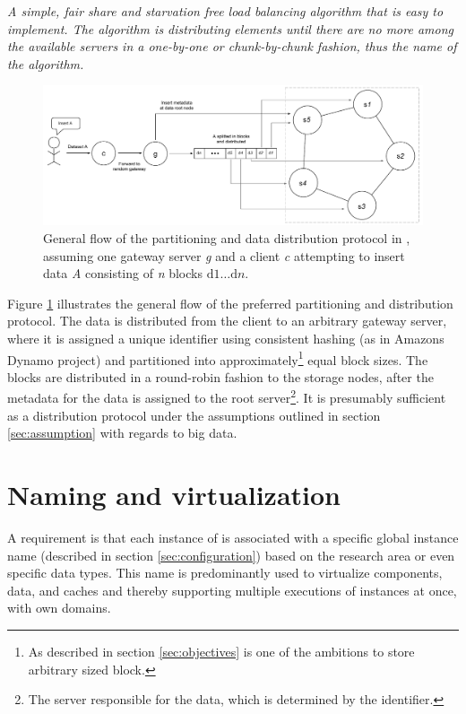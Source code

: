 \begin{definition} \label{def:rr}
\textit{A simple, fair share and starvation free load balancing algorithm that is easy to implement. The algorithm is distributing elements until there are no more among the available servers in a one-by-one or chunk-by-chunk fashion, thus the name of the algorithm.}
\end{definition}
\vspace*{3mm}

\begin{figure}[h!]
	\centering
	\includegraphics[scale=0.5]{pdf/rr-partitioning.pdf}
	\caption[Overview of the partitioning and data distribution protocol]{General flow of the partitioning and data distribution protocol in \CodeName, assuming one gateway server \textit{g} and a client \textit{c} attempting to insert data \textit{A} consisting of \textit{n} blocks $\text{d}1 \ldots \text{d}n$.\label{fig:rr-partitioning}}
\end{figure}

\vspace*{3mm}
Figure \ref{fig:rr-partitioning} illustrates the general flow of the preferred partitioning and distribution protocol. The data is distributed from the client to an arbitrary gateway server, where it is assigned a unique identifier using consistent hashing (as in Amazons Dynamo project) and partitioned into approximately\footnote{As described in section \ref{sec:objectives} is one of the ambitions to store arbitrary sized block.} equal block sizes. The blocks are distributed in a round-robin fashion to the storage nodes, after the metadata for the data is assigned to the root server\footnote{The server responsible for the data, which is determined by the identifier.}. It is presumably sufficient as a distribution protocol under the assumptions outlined in section \ref{sec:assumption} with regards to big data.

\section{Naming and virtualization} \label{sec:virtualization}
A requirement is that each instance of \CodeNameFull is associated with a specific global instance name (described in section \ref{sec:configuration}) \eg based on the research area or even specific data types. This name is predominantly used to virtualize components, data, and caches and thereby supporting multiple executions of \CodeName instances at once, with own domains.
\newline

